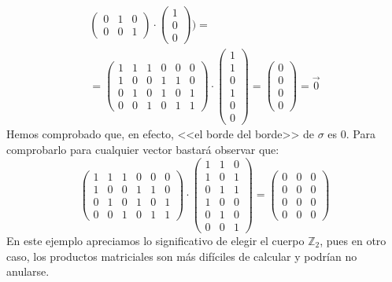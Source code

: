 \documentclass[12pt, a4paper]{article}
\numberwithin{equation}{section}
\theoremstyle{definition}
\newenvironment{ejem}
  {\pushQED{\qed}\renewcommand{\qedsymbol}{$\blacktriangleleft$}\ejemplo}
  {\popQED\endejemplo}
\theoremstyle{remark}
\theoremstyle{plain}
\begin{document}
\begin{ejem}
\begin{equation*}
\begin{split}
\begin{pmatrix}
				0 & 1 & 0 \\
				0 & 0 & 1
				\end{pmatrix}
				\cdot
				\begin{pmatrix}
				1 \\
				0 \\
				0 
				\end{pmatrix} \Bigg ) = \\
				=\begin{pmatrix}
				1 & 1 & 1 & 0 & 0 &0 \\
				1 & 0 & 0 & 1 & 1 &0 \\
				0 & 1 & 0 & 1 & 0 &1 \\
				0 & 0 & 1 & 0 & 1 &1
				\end{pmatrix}
				\cdot
				\begin{pmatrix}
				1 \\
				1 \\
				0 \\
				1 \\
				0 \\
				0
				\end{pmatrix} =
				\begin{pmatrix}
                                0 \\
				0 \\
				0 \\
				0
				\end{pmatrix}=
				\vec{0}
			\end{split}
		\end{equation*}
		Hemos comprobado que, en efecto, <<el borde del borde>> de 
		$\sigma$ es 0. Para comprobarlo para cualquier vector bastará 
		observar que:
		\begin{equation*}
		\begin{pmatrix}
				1 & 1 & 1 & 0 & 0 &0 \\
				1 & 0 & 0 & 1 & 1 &0 \\
				0 & 1 & 0 & 1 & 0 &1 \\
				0 & 0 & 1 & 0 & 1 &1
			\end{pmatrix}\cdot 
				\begin{pmatrix}
				1 & 1 & 0 \\
				1 & 0 & 1 \\
				0 & 1 & 1 \\
				1 & 0 & 0 \\
				0 & 1 & 0 \\
				0 & 0 & 1
				\end{pmatrix}
				=
				\begin{pmatrix}
				0 & 0 & 0 \\
				0 & 0 & 0 \\
				0 & 0 & 0 \\
				0 & 0 & 0 
				\end{pmatrix}
		\end{equation*}
		En este ejemplo apreciamos lo significativo de elegir el 
		cuerpo $\mathbb{Z}_{2}$, pues en otro caso, los productos 
		matriciales son más difíciles de calcular y podrían no 
		anularse.
	\end{ejem}
\end{document}
